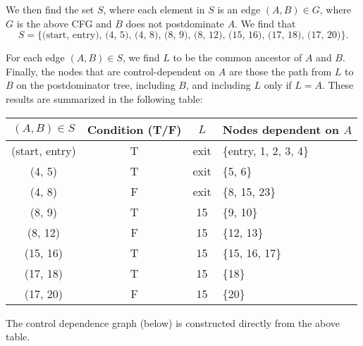 \documentclass{article}
\newcommand\s[1]{\{#1\}}
\begin{document}
\begin{enumerate}
    We then find the set $S$, where each element in $S$ is an edge
    $(A, B) \in G$, where $G$ is the above CFG and $B$ does not
    postdominate $A$. We find that
    \begin{equation*}
      S = \text{\s{(start, entry), (4, 5), (4, 8), (8, 9), (8, 12),
          (15, 16), (17, 18), (17, 20)}}.
    \end{equation*}

    For each edge $(A,B) \in S$, we find $L$ to be the common ancestor
    of $A$ and $B$. Finally, the nodes that are control-dependent on
    $A$ are those the path from $L$ to $B$ on the postdominator tree,
    including $B$, and including $L$ only if $L=A$. These results are
    summarized in the following table:
    \begin{center}
      \begin{tabular}{cccl}
        \toprule
        $(A,B) \in S$ & Condition (T/F) & $L$ & Nodes dependent on
        $A$ \\
        \midrule
        (start, entry) & T & exit & \s{entry, 1, 2, 3, 4} \\
        (4, 5)         & T & exit & \s{5, 6} \\
        (4, 8)         & F & exit & \s{8, 15, 23} \\
        (8, 9)         & T & 15   & \s{9, 10} \\
        (8, 12)        & F & 15   & \s{12, 13} \\
        (15, 16)       & T & 15   & \s{15, 16, 17} \\
        (17, 18)       & T & 15   & \s{18} \\
        (17, 20)       & F & 15   & \s{20} \\
        \bottomrule
      \end{tabular}
    \end{center}

    The control dependence graph (below) is constructed directly from the
    above table.
    \begin{center}
      \begin{minipage}[b]{.8\linewidth}
        \begin{center}
\end{center}
\end{minipage}
\end{center}
\end{enumerate}
\end{document}
